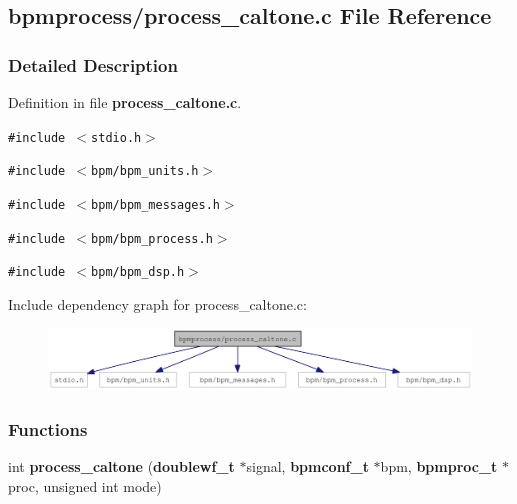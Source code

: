 \subsection{bpmprocess/process\_\-caltone.c File Reference}
\label{process__caltone_8c}


\subsubsection{Detailed Description}


Definition in file {\bf process\_\-caltone.c}.

{\tt \#include $<$stdio.h$>$}\par
{\tt \#include $<$bpm/bpm\_\-units.h$>$}\par
{\tt \#include $<$bpm/bpm\_\-messages.h$>$}\par
{\tt \#include $<$bpm/bpm\_\-process.h$>$}\par
{\tt \#include $<$bpm/bpm\_\-dsp.h$>$}\par


Include dependency graph for process\_\-caltone.c:\nopagebreak
\begin{figure}[H]
\begin{center}
\leavevmode
\includegraphics[width=321pt]{process__caltone_8c__incl}
\end{center}
\end{figure}
\subsubsection*{Functions}
\begin{CompactItemize}
\item 
int {\bf process\_\-caltone} ({\bf doublewf\_\-t} $\ast$signal, {\bf bpmconf\_\-t} $\ast$bpm, {\bf bpmproc\_\-t} $\ast$proc, unsigned int mode)
\end{CompactItemize}
